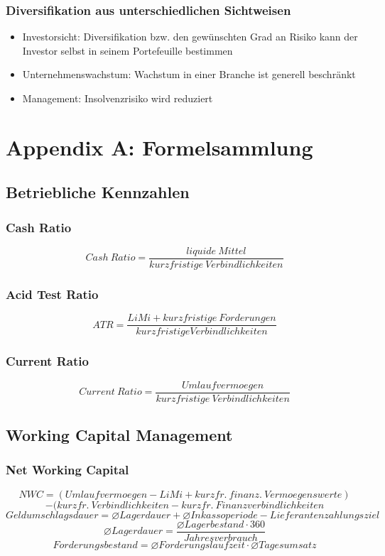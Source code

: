 \subsubsection{Diversifikation aus unterschiedlichen Sichtweisen}
\begin{itemize}
	\item Investorsicht: Diversifikation bzw. den gewünschten Grad an Risiko kann der Investor selbst in seinem Portefeuille bestimmen
	\item Unternehmenswachstum: Wachstum in einer Branche ist generell beschränkt
	\item Management: Insolvenzrisiko wird reduziert
\end{itemize}



\section{Appendix A: Formelsammlung}

\subsection{Betriebliche Kennzahlen}

\subsubsection{Cash Ratio}
\[Cash~Ratio = \frac{liquide~Mittel}{kurzfristige~Verbindlichkeiten}\]

\subsubsection{Acid Test Ratio}
\[ATR = \frac{LiMi + kurzfristige~Forderungen}{kurzfristige Verbindlichkeiten}\]

\subsubsection{Current Ratio}
\[Current~Ratio = \frac{Umlaufvermoegen}{kurzfristige~Verbindlichkeiten}\]


\subsection{Working Capital Management}

\subsubsection{Net Working Capital}
\[NWC = (Umlaufvermoegen - LiMi + kurzfr.~finanz.~Vermoegenswerte)\]
\[- (kurzfr.~Verbindlichkeiten - kurzfr.~Finanzverbindlichkeiten\]
\[Geldumschlagsdauer = \varnothing Lagerdauer + \varnothing Inkassoperiode - Lieferantenzahlungsziel\]
\[\varnothing Lagerdauer = \frac{\varnothing Lagerbestand \cdot 360}{Jahresverbrauch}\]
\[Forderungsbestand = \varnothing Forderungslaufzeit \cdot \varnothing Tagesumsatz\]


